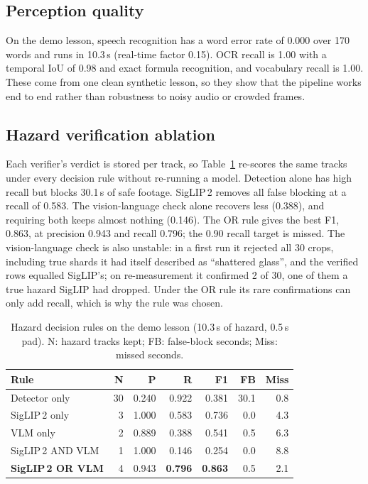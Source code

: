 \documentclass[conference,a4paper]{IEEEtran}
\newcommand{\tab}[1]{Table~\ref{#1}}
\begin{document}
\subsection{Perception quality}
On the demo lesson, speech recognition has a word error rate of 0.000 over 170 words and runs in 10.3\,s (real-time
factor 0.15). OCR recall is 1.00 with a temporal IoU of 0.98 and exact formula recognition, and vocabulary recall is
1.00. These come from one clean synthetic lesson, so they show that the pipeline works end to end rather than robustness
to noisy audio or crowded frames.

\subsection{Hazard verification ablation}
Each verifier's verdict is stored per track, so \tab{tab:rules} re-scores the same tracks under every decision rule
without re-running a model. Detection alone has high recall but blocks 30.1\,s of safe footage. SigLIP\,2 removes all
false blocking at a recall of 0.583. The vision-language check alone recovers less (0.388), and requiring both keeps
almost nothing (0.146). The OR rule gives the best F1, 0.863, at precision 0.943 and recall 0.796; the 0.90 recall
target is missed. The vision-language check is also unstable: in a first run it rejected all 30 crops, including true
shards it had itself described as ``shattered glass'', and the verified rows equalled SigLIP's; on re-measurement it
confirmed 2 of 30, one of them a true hazard SigLIP had dropped. Under the OR rule its rare confirmations can only add
recall, which is why the rule was chosen.

\begin{table}[t]
\centering
\caption{Hazard decision rules on the demo lesson (10.3\,s of hazard, 0.5\,s pad). N: hazard tracks kept; FB:
false-block seconds; Miss: missed seconds.}
\label{tab:rules}
\footnotesize
\begin{tabular}{@{}lrrrrrr@{}}
\toprule
Rule & N & P & R & F1 & FB & Miss\\
\midrule
Detector only & 30 & 0.240 & 0.922 & 0.381 & 30.1 & 0.8\\
SigLIP\,2 only & 3 & 1.000 & 0.583 & 0.736 & 0.0 & 4.3\\
VLM only & 2 & 0.889 & 0.388 & 0.541 & 0.5 & 6.3\\
SigLIP\,2 AND VLM & 1 & 1.000 & 0.146 & 0.254 & 0.0 & 8.8\\
\textbf{SigLIP\,2 OR VLM} & 4 & 0.943 & \textbf{0.796} & \textbf{0.863} & 0.5 & 2.1\\
\bottomrule
\end{tabular}
\end{table}
\end{document}
